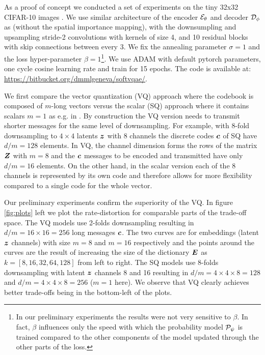 \documentclass{article} %
\newcommand{\gEt}{\gE_\theta}
\newcommand{\gDp}{\gD_\phi}
\newcommand{\gPp}{\gP_{\psi}}
\begin{document}
As a proof of concept we conducted a set of experiments on the tiny 32x32 CIFAR-10 images \citep{krizhevskyLearningMultipleLayers2009}.
We use similar architecture of the encoder $\gEt$ and decoder $\gDp$ as \citet{mentzerConditionalProbabilityModels2018} (without the spatial importance mapping), with the downsumpling and upsampling stride-2 convolutions with kernels of size 4, and 10 residual blocks with skip connections between every 3.
We fix the annealing parameter $\sigma=1$ and the loss hyper-parameter $\beta=1$\footnote{In our preliminary experiments the results were not very sensitive to $\beta$. In fact, $\beta$ influences only the speed with which the probability model $\gPp$ is trained compared to the other components of the model updated through the other parts of the loss.}.
We use ADAM with default pytorch parameters, one cycle cosine learning rate and train for 15 epochs.
The code is available at: \url{https://bitbucket.org/dmmlgeneva/softvqae/}.

We first compare the vector quantization (VQ) approach where the codebook is composed of $m$-long vectors versus the scalar (SQ) approach where it contains scalars $m=1$ as e.g. in \cite{mentzerConditionalProbabilityModels2018}.
By construction the VQ version needs to transmit shorter messages for the same level of downsampling. For example, with 8-fold downsampling to $4 \times 4$ latents ${\bm{z}}$ with 8 channels the discrete codes ${\bm{c}}$ of SQ have $d/m = 128$ elements.
In VQ, the channel dimension forms the rows of the matrix ${\bm{Z}}$ with $m=8$ and the ${\bm{c}}$ messages to be encoded and transmitted have only $d/m = 16$ elements.
On the other hand, in the scalar version each of the 8 channels is represented by its own code and therefore allows for more flexibility compared to a single code for the whole vector.

Our preliminary experiments confirm the superiority of the VQ. In figure \ref{fig:plots} left we plot the rate-distortion for comparable parts of the trade-off space.
The VQ models use 2-folds downsampling resulting in $d/m = 16 \times 16 = 256$ long messages ${\bm{c}}$.
The two curves are for embeddings (latent ${\bm{z}}$ channels) with size $m=8$ and $m=16$ respectively and the points around the curves are the result of increasing the size of the dictionary ${\bm{E}}$ as $k = [8, 16, 32, 64, 128]$ from left to right.
The SQ models use 8-folds downsampling with latent ${\bm{z}}$ channels 8 and 16 resulting in $d/m = 4 \times 4 \times 8 = 128$ and $d/m = 4 \times 4 \times 8 = 256$ ($m=1$ here). We observe that VQ clearly achieves better trade-offs being in the bottom-left of the plots.
\end{document}
